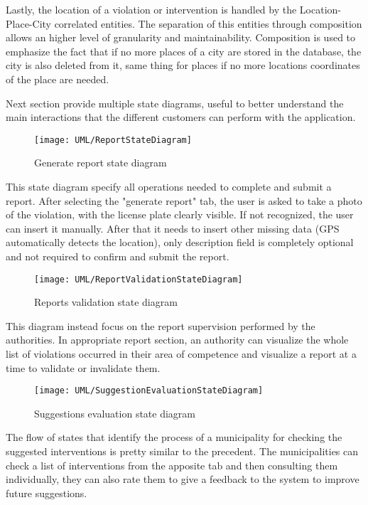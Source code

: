 Lastly, the location of a violation or intervention is handled by the Location-Place-City correlated entities. The separation of this entities through composition allows an higher level of granularity and maintainability. Composition is used to emphasize the fact that if no more places of a city are stored in the database, the city is also deleted from it, same thing for places if no more locations coordinates of the place are needed.

Next section provide multiple state diagrams, useful to better understand the main interactions that the different customers can perform with the application. 

\begin{figure}[H]
	\centering
	\texttt{[image: UML/ReportStateDiagram]}
	\caption{Generate report state diagram}
\end{figure}

This state diagram specify all operations needed to complete and submit a report. After selecting the "generate report" tab, the user is asked to take a photo of the violation, with the license plate clearly visible. If not recognized, the user can insert it manually. After that it needs to insert other missing data (GPS automatically detects the location), only description field is completely optional and not required to confirm and submit the report.

\begin{figure}[H]
	\centering
	\texttt{[image: UML/ReportValidationStateDiagram]}
	\caption{Reports validation state diagram}
\end{figure}

This diagram instead focus on the report supervision performed by the authorities. In appropriate report section, an authority can visualize the whole list of violations occurred in their area of competence and visualize a report at a time to validate or invalidate them.

\begin{figure}[H]
	\centering
	\texttt{[image: UML/SuggestionEvaluationStateDiagram]}
	\caption{Suggestions evaluation state diagram}
\end{figure}

The flow of states that identify the process of a municipality for checking the suggested interventions is pretty similar to the precedent. The municipalities can check a list of interventions from the apposite tab and then consulting them individually, they can also rate them to give a feedback to the system to improve future suggestions.

